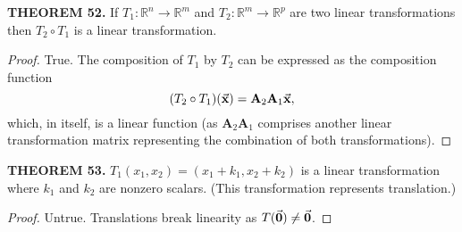 \documentclass[12pt]{article}
\newcommand{\mat}[1]{\mathbf{#1}}
\newcommand{\theorem}[2]{\textbf{THEOREM #1.} #2}
\begin{document}
\theorem{52}{If $T_{1} : \mathbb{R}^{n} \to \mathbb{R}^{m}$ and $T_{2} : \mathbb{R}^{m} \to \mathbb{R}^{p}$ are two linear transformations then $T_{2} \circ T_{1}$ is a linear transformation.}

\begin{proof}
True. The composition of $T_{1}$ by $T_{2}$ can be expressed as the composition function
\begin{equation*}
(T_{2} \circ T_{1})(\va{x}) = \mat{A}_{2} \mat{A}_{1} \va{x},
\end{equation*}
which, in itself, is a linear function (as $\mat{A}_{2} \mat{A}_{1}$ comprises another linear transformation matrix representing the combination of both transformations).
\end{proof}

\theorem{53}{$T_{1}(x_{1},x_{2}) = (x_{1} + k_{1}, x_{2} + k_{2})$ is a linear transformation where $k_{1}$ and $k_{2}$ are nonzero scalars. (This transformation represents translation.)}

\begin{proof}
Untrue. Translations break linearity as $T(\va{0}) \ne \va{0}$.
\end{proof}
\end{document}
